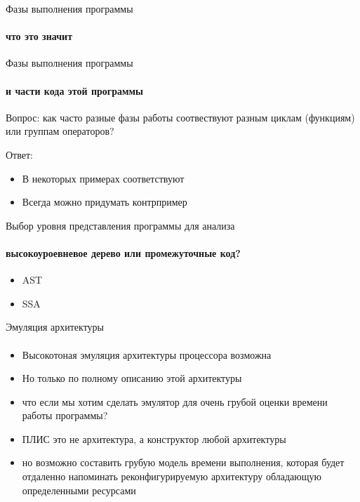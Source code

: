 \documentclass{beamer}              %
\begin{document}
\begin{frame}{Фазы выполнения программы}
  \framesubtitle{что это значит}
  
\end{frame}

\begin{frame}{Фазы выполнения программы}
  \framesubtitle{и части кода этой программы}
  Вопрос: как часто разные фазы работы соотвествуют разным циклам (функциям) или группам операторов?
  
  Ответ: 
  \begin{itemize}
      \item В некоторых примерах соответствуют
      \item Всегда можно придумать контрпример
  \end{itemize}
  
\end{frame}

\begin{frame}{Выбор уровня представления программы для анализа}
  \framesubtitle{высокоуроевневое дерево или промежуточные код?}
  
  \begin{itemize}
      \item AST
      \item SSA
  \end{itemize}
  
\end{frame}

\begin{frame}{Эмуляция архитектуры}
  \framesubtitle{}
  
  \begin{itemize}
      \item Высокотоная эмуляция архитектуры процессора возможна
      \item Но только по полному описанию этой архитектуры
      \item что если мы хотим сделать эмулятор для очень грубой оценки времени работы программы?
      \item ПЛИС это не архитектура, а конструктор любой архитектуры
      \item но возможно составить грубую модель времени выполнения, которая будет отдаленно напоминать реконфигурируемую архитектуру обладающую определенными ресурсами
  \end{itemize}
  
\end{frame}
\end{document}
